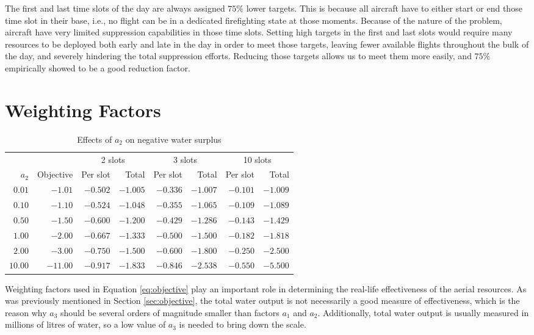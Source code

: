 The first and last time slots of the day are always assigned $75\%$ lower targets.
This is because all aircraft have to either start or end those time slot in their base, i.e., no flight can be in a dedicated firefighting state at those moments.
Because of the nature of the problem, aircraft have very limited suppression capabilities in those time slots.
Setting high targets in the first and last slots would require many resources to be deployed both early and late in the day in order to meet those targets, leaving fewer available flights throughout the bulk of the day, and severely hindering the total suppression efforts.
Reducing those targets allows us to meet them more easily, and $75\%$ empirically showed to be a good reduction factor.


\section{Weighting Factors}

\begin{table}[htb]
\caption{Effects of $a_2$ on negative water surplus}
\label{tbl:weighting-comparison}
\centering
\begin{tabular}{@{}*8r@{}}
~ & ~ & \multicolumn{2}{c}{2 slots} & \multicolumn{2}{c}{3 slots} & \multicolumn{2}{c}{10 slots} \\
\cmidrule(lr){3-4} \cmidrule(lr){5-6} \cmidrule(lr){7-8}
$a_2$ & Objective & Per slot & Total & Per slot & Total & Per slot & Total \\
\midrule
$0.01$  & $-1.01$  & $-0.502$ & $-1.005$ & $-0.336$ & $-1.007$ & $-0.101$ & $-1.009$ \\
$0.10$  & $-1.10$  & $-0.524$ & $-1.048$ & $-0.355$ & $-1.065$ & $-0.109$ & $-1.089$ \\
$0.50$  & $-1.50$  & $-0.600$ & $-1.200$ & $-0.429$ & $-1.286$ & $-0.143$ & $-1.429$ \\
$1.00$  & $-2.00$  & $-0.667$ & $-1.333$ & $-0.500$ & $-1.500$ & $-0.182$ & $-1.818$ \\
$2.00$  & $-3.00$  & $-0.750$ & $-1.500$ & $-0.600$ & $-1.800$ & $-0.250$ & $-2.500$ \\
$10.00$ & $-11.00$ & $-0.917$ & $-1.833$ & $-0.846$ & $-2.538$ & $-0.550$ & $-5.500$ \\
\end{tabular}
\end{table}

Weighting factors used in Equation \ref{eq:objective} play an important role in determining the real-life effectiveness of the aerial resources.
As was previously mentioned in Section \ref{sec:objective}, the total water output is not necessarily a good measure of effectiveness, which is the reason why $a_3$ should be several orders of magnitude smaller than factors $a_1$ and $a_2$.
Additionally, total water output is usually measured in millions of litres of water, so a low value of $a_3$ is needed to bring down the scale.

